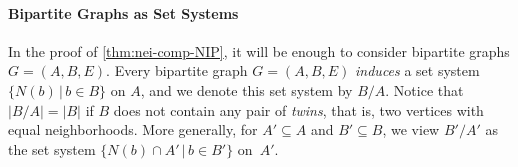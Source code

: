 \documentclass[11pt]{article}
\newtheorem{observation}[theorem]{Observation}
\theoremstyle{definition}
\newcommand{\BB}{{\mathscr B}}
\newcommand{\inducedSS}[2]{#1/#2}%
\renewcommand{\le}{\leqslant}
\renewcommand{\subset}{\subseteq}
\newcommand{\set}[1]{\{#1\}}
\newcommand{\setof}[2]{\set{#1 \,|\, #2 }}
\DeclareMathOperator{\subpoly}{subpoly}
\begin{document}
\paragraph{Bipartite Graphs as Set Systems}
In the proof of \cref{thm:nei-comp-NIP}, it will be enough to consider bipartite graphs $G=(A,B,E)$.
Every bipartite graph $G=(A,B,E)$ \emph{induces} a set system $\setof{N(b)}{b\in B}$ on $A$, and we denote this set system by $\inducedSS{B}{A}$. 
Notice that $|\inducedSS{B}{A}|=|B|$ if $B$ does not contain any pair of \emph{twins}, that is, two vertices with equal neighborhoods.
More generally, for $A'\subset A$ and $B'\subset B$, we view $\inducedSS{B'}{A'}$ as the set system $\setof{N(b)\cap A'}{b\in B'}$ on~$A'$. 




\end{document}
